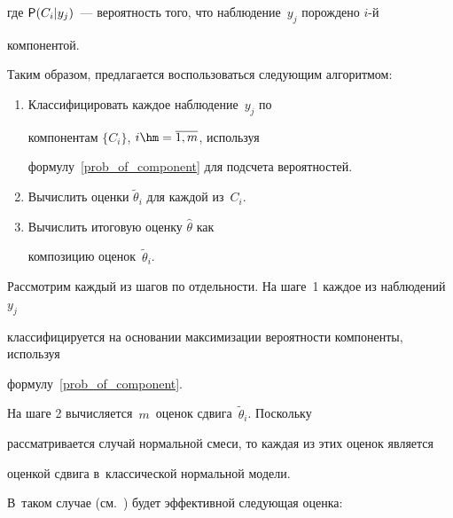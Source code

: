 где ${\sf P}(C_i|y_j)$~--- вероятность того, что наблюдение~$y_j$ порождено $i$-й 


ком\-по\-нентой.


{





}








Таким образом, предлагается воспользоваться следующим алгоритмом:


\begin{enumerate}[1.]


\item Классифицировать каждое наблюдение~$y_j$ по 


компонентам  $\{C_i\}$, $i\hm = \overline{1,m}$, используя


 формулу~\eqref{prob_of_component} для подсчета вероятностей.


\item  Вычислить оценки $\tilde{\theta}_i$ для каждой из~$C_i$.


\item  Вычислить итоговую оценку $\hat{\theta}$ как 


композицию оценок~$\tilde{\theta}_i$.


\end{enumerate}





Рассмотрим каждый из шагов по отдельности. На шаге~1 каждое из наблюдений~$y_j$ 


классифицируется на основании максимизации вероятности компоненты, используя 


формулу~\eqref{prob_of_component}.








На шаге 2 вычисляется~$m$~оценок сдвига~$\tilde{\theta}_i$. Поскольку 


рассматривается случай нормальной смеси, то каждая из этих оценок является 


оценкой сдвига в~классической нормальной модели. 


В~таком случае (см.~\cite{lagutin}) будет эффективной следующая оценка:





\vspace*{-3pt}





